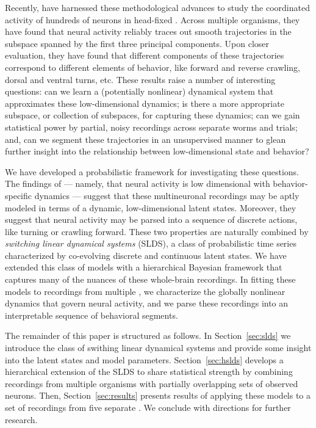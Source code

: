 \documentclass{article}
\begin{document}
Recently, \citet{kato2015global} have harnessed these methodological
advances to study the coordinated activity of hundreds of neurons
in head-fixed \celegans. Across multiple organisms, they have found that
neural activity reliably traces out smooth trajectories in the subspace
spanned by the first three principal components.
Upon closer evaluation, they have found that different components of these
trajectories correspond to different elements of behavior, like
forward and reverse crawling, dorsal and ventral turns, etc. These
results raise a number of interesting questions: can we learn a
(potentially nonlinear) dynamical system that approximates these
low-dimensional dynamics; is there a more appropriate subspace, or
collection of subspaces, for capturing these dynamics; can we gain
statistical power by partial, noisy recordings across separate worms
and trials; and, can we segment these trajectories in an unsupervised
manner to glean further insight into the relationship between
low-dimensional state and behavior?

We have developed a probabilistic framework for investigating these questions.
The findings of \citet{kato2015global} --- namely, that neural activity
is low dimensional with behavior-specific dynamics --- suggest that
these multineuronal recordings may be aptly modeled in terms of
a dynamic, low-dimensional latent states. Moreover, they suggest
that neural activity may be parsed into a sequence of discrete
actions, like turning or crawling forward. These two properties are
naturally combined by \emph{switching linear dynamical systems} (SLDS),
a class of probabilistic time series characterized by co-evolving
discrete and continuous latent states.  We have extended this
class of models with a hierarchical Bayesian framework that captures
many of the nuances of these whole-brain recordings. In fitting these
models to recordings from multiple \celegans, we characterize the
globally nonlinear dynamics that govern neural activity, and we
parse these recordings into an interpretable sequence of behavioral segments.

The remainder of this paper is structured as follows. In Section~\ref{sec:slds}
we introduce the class of swithing linear dynamical systems and provide
some insight into the latent states and model parameters. Section~\ref{sec:hslds}
develops a hierarchical extension of the SLDS to share statistical
strength by combining recordings from multiple organisms with partially
overlapping sets of observed neurons.  Then, Section~\ref{sec:results}
presents results of applying these models to a set of recordings from
five separate \celegans. We conclude with directions for further research.
\end{document}
